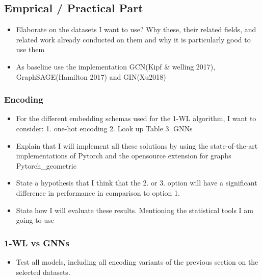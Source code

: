 \documentclass[11pt, dvipsnames, DIV=12]{scrreprt}
\theoremstyle{definition}
\begin{document}
\subsection{Emprical / Practical Part}
\begin{itemize}
    \item Elaborate on the datasets I want to use? Why these, their related fields, and related work already conducted on them and why it is particularly good to use them
    \item As baseline use the implementation GCN(Kipf & welling 2017), GraphSAGE(Hamilton 2017) and GIN(Xu2018)
\end{itemize}
\subsubsection{Encoding}
\begin{itemize}
    \item For the different embedding schemas used for the 1-WL algorithm, I want to consider: 1. one-hot encoding 2. Look up Table 3. GNNs
    \item Explain that I will implement all these solutions by using the state-of-the-art implementations of Pytorch and the opensource extension for graphs Pytorch\_geometric
    \item State a hypothesis that I think that the 2. or 3. option will have a significant difference in performance in comparison to option 1.
    \item State how I will evaluate these results. Mentioning the statistical tools I am going to use
\end{itemize}

\subsubsection{1-WL vs GNNs}
\begin{itemize}
    \item Test all models, including all encoding variants of the previous section on the selected datasets.
\end{itemize}


\end{document}
